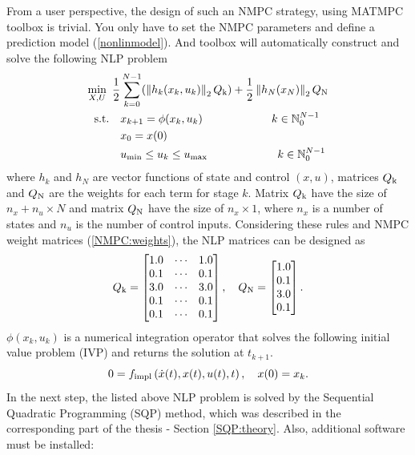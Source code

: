 From a user perspective, the design of such an NMPC strategy, using \textsc{MATMPC} toolbox is trivial. You only have to set the NMPC parameters and define a prediction model (\ref{nonlinmodel}). And toolbox will automatically construct and solve the following NLP problem
\begin{subequations}\label{NLP}
	\begin{align}
	\min_{X,U}\ \frac{1}{2}&\sum_{k=0}^{N-1} (\left\| h_k(x_k, u_k)\right\|_2Q _{\text{k}}) + \frac{1}{2}\left\|h_N(x_N)\right\|_2Q _{\text{N}}\\
	\text{s.t.}\quad &x_{k+1} = \phi(x_{k},u_{k})\qquad\qquad\qquad\, k \in \mathbb{N}_0^{N-1}\\
	&x_0 = x(0)\\
	&u _{\text{min}}\leq u_{k}\leq u _{\text{max}}\qquad\qquad\qquad\;   k \in \mathbb{N}_0^{N-1}	
	\end{align}
\end{subequations}
where $h_k$ and $h_N$ are vector functions of state and control $(x, u)$, matrices $Q _{\text{k}}$ and $Q _{\text{N}}$ are the weights for each term for stage $k$. Matrix $Q _{\text{k}}$ have the size of $n_x+n_u\times N$ and matrix $Q _{\text{N}}$ have the size of $n_x\times 1$, where $n_x$ is a number of states and $n_u$ is the number of control inputs. Considering these rules and NMPC weight matrices (\ref{NMPC:weights}), the NLP matrices can be designed as
\begin{equation}\label{NLP:weights}
Q _{\text{k}} = \begin{bmatrix}
				1.0&\cdots&1.0\\
				0.1&\cdots&0.1\\
				3.0&\cdots&3.0\\
				0.1&\cdots&0.1\\
				0.1&\cdots&0.1
			\end{bmatrix}, \quad 
Q _{\text{N}} =	\begin{bmatrix}
				1.0\\
				0.1\\
				3.0\\
				0.1
			\end{bmatrix}.
\end{equation}
$\phi(x_{k},u_{k})$ is a numerical integration operator that solves the following initial value problem (IVP) and returns the solution at $t_{k+1}$.
\begin{equation}
0=f _{\text{impl}}\left( \dot{x}(t), x(t),u(t),t \right),\quad x(0)=x_k.
\end{equation}
In the next step, the listed above NLP problem is solved by the Sequential Quadratic Programming (SQP) method, which was described in the corresponding part of the thesis - Section \ref{SQP:theory}. Also, additional software must be installed:
